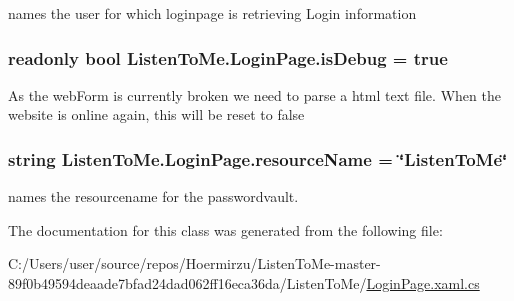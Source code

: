 names the user for which loginpage is retrieving Login information 

\subsubsection[{\texorpdfstring{is\+Debug}{isDebug}}]{\setlength{\rightskip}{0pt plus 5cm}readonly bool Listen\+To\+Me.\+Login\+Page.\+is\+Debug = true\hspace{0.3cm}{\ttfamily [private]}}\hypertarget{class_listen_to_me_1_1_login_page_afb3d704904757345ed85b1143bccccb0}{}\label{class_listen_to_me_1_1_login_page_afb3d704904757345ed85b1143bccccb0}


As the web\+Form is currently broken we need to parse a html text file. When the website is online again, this will be reset to false 

\subsubsection[{\texorpdfstring{resource\+Name}{resourceName}}]{\setlength{\rightskip}{0pt plus 5cm}string Listen\+To\+Me.\+Login\+Page.\+resource\+Name = \char`\"{}Listen\+To\+Me\char`\"{}\hspace{0.3cm}{\ttfamily [private]}}\hypertarget{class_listen_to_me_1_1_login_page_aa0fc5c3c6f21dc7322caa046ff9c2897}{}\label{class_listen_to_me_1_1_login_page_aa0fc5c3c6f21dc7322caa046ff9c2897}


names the resourcename for the passwordvault. 



The documentation for this class was generated from the following file\+:\begin{DoxyCompactItemize}
\item 
C\+:/\+Users/user/source/repos/\+Hoermirzu/\+Listen\+To\+Me-\/master-\/89f0b49594deaade7bfad24dad062ff16eca36da/\+Listen\+To\+Me/\hyperlink{_login_page_8xaml_8cs}{Login\+Page.\+xaml.\+cs}\end{DoxyCompactItemize}

